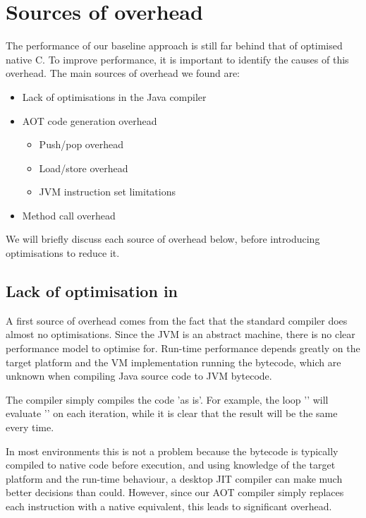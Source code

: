 \section{Sources of overhead}
The performance of our baseline approach is still far behind that of optimised native C. To improve performance, it is important to identify the causes of this overhead. The main sources of overhead we found are:
\begin{itemize}
	\item Lack of optimisations in the Java compiler
	\item AOT code generation overhead
	\begin{itemize}
		\item Push/pop overhead
		\item Load/store overhead
		\item JVM instruction set limitations
	\end{itemize}
	\item Method call overhead
\end{itemize}

We will briefly discuss each source of overhead below, before introducing optimisations to reduce it.

\subsection{Lack of optimisation in }
A first source of overhead comes from the fact that the standard  compiler does almost no optimisations.  Since the JVM is an abstract machine, there is no clear performance model to optimise for. Run-time performance depends greatly on the target platform and the VM implementation running the bytecode, which are unknown when compiling Java source code to JVM bytecode.

The  compiler simply compiles the code 'as is'. For example, the loop '' will evaluate '' on each iteration, while it is clear that the result will be the same every time.

In most environments this is not a problem because the bytecode is typically compiled to native code before execution, and using knowledge of the target platform and the run-time behaviour, a desktop JIT compiler can make much better decisions than  could. However, since our AOT compiler simply replaces each instruction with a native equivalent, this leads to significant overhead.

